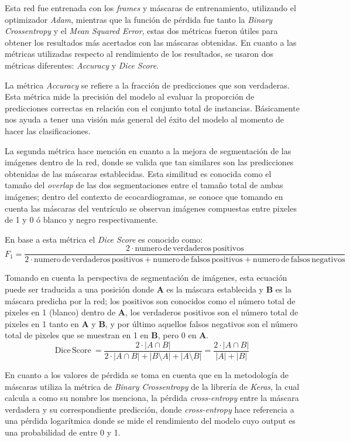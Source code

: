 \documentclass[runningheads]{llncs}
\begin{document}
Esta red fue entrenada con los \textit{frames} y máscaras de entrenamiento, utilizando el optimizador \textit{Adam}, mientras que la función de pérdida fue tanto la \textit{Binary Crossentropy} y el \textit{Mean Squared Error}, estas dos métricas fueron útiles para obtener los resultados más acertados con las máscaras obtenidas. En cuanto a las métricas utilizadas respecto al rendimiento de los resultados, se usaron dos métricas diferentes: \textit{Accuracy} y \textit{Dice Score}.

La métrica \textit{Accuracy} se refiere a la fracción de predicciones que son verdaderas. Esta métrica mide la precisión del modelo al evaluar la proporción de predicciones correctas en relación con el conjunto total de instancias. Básicamente nos ayuda a tener una visión más general del éxito del modelo al momento de hacer las clasificaciones.

La segunda métrica hace mención en cuanto a la mejora de segmentación de las imágenes dentro de la red, donde se valida que tan similares son las predicciones obtenidas de las máscaras establecidas. Esta similitud es conocida como el tamaño del \textit{overlap} de las dos segmentaciones entre el tamaño total de ambas imágenes; dentro del contexto de ecocardiogramas, se conoce que tomando en cuenta las máscaras del ventrículo se observan imágenes compuestas entre pixeles de 1 y 0 ó blanco y negro respectivamente. 

En base a esta métrica el \textit{Dice Score} es conocido como:
\[
F_{1} = \frac{2 \cdot \text{numero}\,\text{de}\,\text{verdaderos}\,\text{positivos}}{2 \cdot \text{numero}\,\text{de}\,\text{verdaderos}\,\text{positivos} + \text{numero}\,\text{de}\,\text{falsos}\,\text{positivos} + \text{numero}\,\text{de}\,\text{falsos}\,\text{negativos}}
\]

Tomando en cuenta la perspectiva de segmentación de imágenes, esta ecuación puede ser traducida a una posición donde \textbf{A} es la máscara establecida y \textbf{B} es la máscara predicha por la red; los positivos son conocidos como el número total de pixeles en 1 (blanco) dentro de \textbf{A}, los verdaderos positivos son el número total de pixeles en 1 tanto en \textbf{A} y \textbf{B}, y por último aquellos falsos negativos son el número total de pixeles que se muestran en 1 en \textbf{B}, pero 0 en \textbf{A}.
\[
\text{Dice}\,\text{Score}\ = \frac{2 \cdot |A \cap B|}{2 \cdot |A \cap B| + |B \setminus A| + |A \setminus B|} = \frac{2 \cdot |A \cap B|}{|A| + |B|}
\]

En cuanto a los valores de pérdida se toma en cuenta que en la metodología de máscaras utiliza la métrica de \textit{Binary Crossentropy} de la librería de \textit{Keras}, la cual calcula a como su nombre los menciona, la pérdida \textit{cross-entropy} entre la máscara verdadera y su correspondiente predicción, donde \textit{cross-entropy} hace referencia a una pérdida logarítmica donde se mide el rendimiento del modelo cuyo output es una probabilidad de entre 0 y 1.
\end{document}
